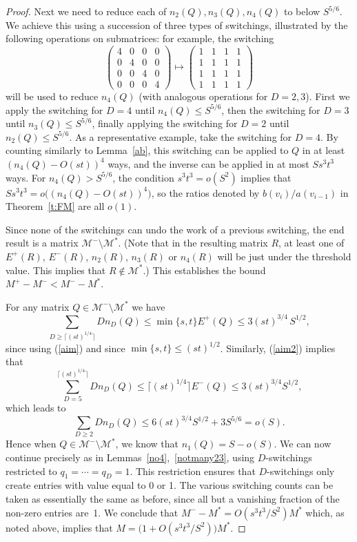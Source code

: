 \documentclass[12pt]{article}
\numberwithin{equation}{section}
\def\M{{\mathcal{M}}}
\def\({\bigl(}   \def\){\bigr)}
\begin{document}
\begin{proof}
Next we need to reduce each of $n_2(Q), n_3(Q), n_4(Q)$ to
below $S^{5/6}$.  We achieve this using a succession of three types of
switchings, illustrated by the following operations on submatrices:
for example, the switching
\[
  \begin{pmatrix} 4 & 0 & 0 & 0\\         
                  0 & 4 & 0 & 0\\
                  0 & 0 & 4 & 0\\
                  0 & 0 & 0 & 4\end{pmatrix}
          \mapsto
                  \begin{pmatrix} 1 & 1 & 1 & 1\\ 1 & 1 & 1 & 1\\
                             1 & 1 & 1 & 1\\ 1 & 1 & 1 & 1\end{pmatrix}
\]
will be used to reduce $n_4(Q)$
(with analogous operations for $D=2,3$).
First we apply the
switching for $D=4$ until $n_{4}(Q)\le S^{5/6}$, then the switching
for $D=3$ until $n_3(Q)\le S^{5/6}$, finally applying
the switching for $D=2$ until $n_{2}(Q)\le S^{5/6}$.  
As a representative example, take the switching for $D=4$.
By counting similarly to Lemma~\ref{ab}, this switching can
be applied to $Q$ in at least $(n_4(Q)-O(st))^4$ ways, and the
inverse can be applied in at most $Ss^3t^3$ ways.  For
$n_4(Q)>S^{5/6}$, the condition $s^3t^3=o(S^2)$ implies that
$Ss^3t^3=o\((n_4(Q)-O(st))^4\)$, so the ratios 
denoted by $b(v_i)/a(v_{i-1})$ in Theorem~\ref{t:FM} are all 
$o(1)$.  

Since none of the 
switchings can undo the work of a previous switching, the end
result is a matrix $\M^-\setminus\M^\ast$. 
(Note that in the resulting matrix $R$,  at least one of
$E^+(R)$, $E^-(R)$, $n_2(R)$, $n_3(R)$ or $n_4(R)$ will be
just under the threshold value. 
This implies that $R\not\in\M^\ast$.)
This establishes the bound $M^+{-}M^-< M^-{-}M^\ast$.

For any matrix $Q\in\M^-\setminus\M^\ast$ we have
\[ \sum_{D\geq \lceil (st)^{1/4}\rceil} D n_D(Q)
  \leq \min\{s,t\} E^+(Q) \leq 3(st)^{3/4}\, S^{1/2},
\]
since using (\ref{aim}) and since $\min\{ s,t\} \leq (st)^{1/2}$.  
Similarly, (\ref{aim2}) implies that
\[ \sum_{D=5}^{\lceil (st)^{1/4}\rceil} D n_D(Q)
  \leq \lceil (st)^{1/4}\rceil E^-(Q) \leq  3(st)^{3/4} S^{1/2},
\]
which leads to
\[ \sum_{D\geq 2} Dn_D(Q) \leq 6(st)^{3/4} S^{1/2} + 3S^{5/6} = o(S).
\]
Hence when $Q\in\M^-\setminus\M^\ast$, we know that $n_1(Q)=S-o(S)$.
We can now continue precisely as in Lemmas~\ref{no4},~\ref{notmany23},
using $D$-switchings restricted to $q_1=\cdots=q_D=1$.
This restriction ensures that $D$-switchings only create entries
with value equal to 0 or 1.  The various switching counts can be
taken as essentially the same as before, since
all but a vanishing fraction of the non-zero entries are~1.
We conclude that $M^-{-}M^\ast =O(s^3t^3/S^2)M^\ast$ which, as noted above, 
implies that $M=\(1+O(s^3t^3/S^2)\)M^\ast$.


\end{proof}
\end{document}
